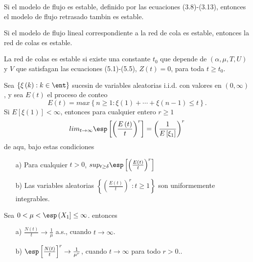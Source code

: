 \begin{Lema}\label{Lema3.1}
Si el modelo de flujo es estable, definido por las ecuaciones
(3.8)-(3.13), entonces el modelo de flujo retrasado tambin es
estable.
\end{Lema}

\begin{Teo}\label{Tma.5.2}
Si el modelo de flujo lineal correspondiente a la red de cola es
estable, entonces la red de colas es estable.
\end{Teo}

\begin{Teo}\label{Tma.5.1.Chen}
La red de colas es estable si existe una constante $t_{0}$ que
depende de $\left(\alpha,\mu,T,U\right)$ y $V$ que satisfagan las
ecuaciones (5.1)-(5.5), $Z\left(t\right)=0$, para toda $t\geq
t_{0}$.
\end{Teo}



\begin{Lema}\label{Lema.5.2.Gut}
Sea $\left\{\xi\left(k\right):k\in\ent\right\}$ sucesin de
variables aleatorias i.i.d. con valores en
$\left(0,\infty\right)$, y sea $E\left(t\right)$ el proceso de
conteo
\[E\left(t\right)=max\left\{n\geq1:\xi\left(1\right)+\cdots+\xi\left(n-1\right)\leq t\right\}.\]
Si $E\left[\xi\left(1\right)\right]<\infty$, entonces para
cualquier entero $r\geq1$
\begin{equation}
lim_{t\rightarrow\infty}\esp\left[\left(\frac{E\left(t\right)}{t}\right)^{r}\right]=\left(\frac{1}{E\left[\xi_{1}\right]}\right)^{r}
\end{equation}
de aqu, bajo estas condiciones
\begin{itemize}
\item[a)] Para cualquier $t>0$,
$sup_{t\geq\delta}\esp\left[\left(\frac{E\left(t\right)}{t}\right)^{r}\right]$

\item[b)] Las variables aleatorias
$\left\{\left(\frac{E\left(t\right)}{t}\right)^{r}:t\geq1\right\}$
son uniformemente integrables.
\end{itemize}
\end{Lema}

\begin{Teo}\label{Tma.5.1.Gut} Sea
$0<\mu<\esp\left(X_{1}\right]\leq\infty$. entonces

\begin{itemize}
\item[a)] $\frac{N\left(t\right)}{t}\rightarrow\frac{1}{\mu}$
a.s., cuando $t\rightarrow\infty$.


\item[b)]$\esp\left[\frac{N\left(t\right)}{t}\right]^{r}\rightarrow\frac{1}{\mu^{r}}$,
cuando $t\rightarrow\infty$ para todo $r>0$..
\end{itemize}
\end{Teo}


